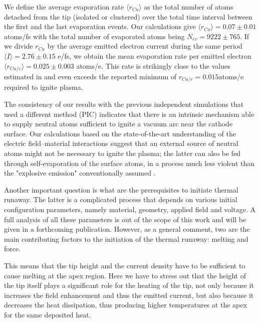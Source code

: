 \documentclass[%
 aps,
 prb,%
 amsmath,amssymb,
reprint,%
superscriptaddress,
]{revtex4-1}
\begin{document}
We define the average evaporation rate $\langle r_{Cu} \rangle$ as the total number of atoms detached from the tip (isolated or clustered) over the total time interval between the first and the last evaporation events. 
Our calculations give $\langle r_{Cu} \rangle = 0.07 \pm 0.01$ atoms/fs with the total number of evaporated atoms being $N_{ev} = 9222 \pm 765$. 
If we divide $r_{Cu}$ by the average emitted electron current during the same period $\langle I \rangle = 2.76 \pm 0.15$ e/fs, we obtain the mean evaporation rate per emitted electron $\langle r_{Cu/e} \rangle = 0.025 \pm 0.003$ atoms/e.
This rate is strikingly close to the values estimated in \cite{arcPIC} and even exceeds the reported minimum of $ r_{Cu/e} = 0.015 \textrm{atoms/e}$ required to ignite plasma.

The consistency of our results with the previous independent simulations that used a different method (PIC) indicates that there is an intrinsic mechanism able to supply neutral atoms sufficient to ignite a vacuum arc near the cathode surface.
Our calculations based on the state-of-the-art understanding of the electric field--material interactions suggest that an external source of neutral atoms might not be necessary to ignite the plasma; the latter can also be fed through self-evaporation of the surface atoms, in a process much less violent than the "explosive emission" conventionally assumed \cite{Anders,Mesyats_Ecton,Mesyats2005}.

Another important question is what are the prerequisites to initiate thermal runaway.
The latter is a complicated process that depends on various initial configuration parameters, namely material, geometry, applied field and voltage.
A full analysis of all these parameters is out of the scope of this work and will be given in a forthcoming publication. 
However, as a general comment, two are the main contributing factors to the initiation of the thermal runaway: melting and force.

This means that the tip height and the current density have to be sufficient to cause melting at the apex region.
Here we have to stress out that the height of the tip itself plays a significant role for the heating of the tip, not only because it increases the field enhancement and thus the emitted current, but also because it decreases the heat dissipation, thus producing higher temperatures at the apex for the same deposited heat.
\end{document}
